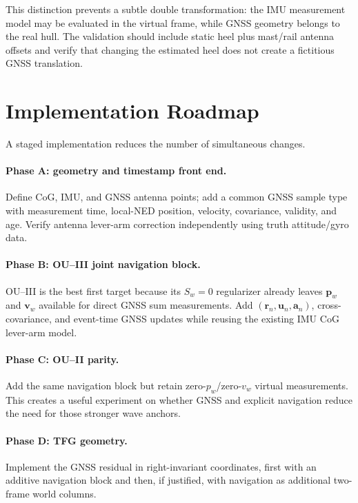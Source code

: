 \documentclass[conference]{IEEEtran}
\DeclareRobustCommand{\vct}[1]{\bm{#1}}
\begin{document}
This distinction prevents a subtle double transformation: the IMU measurement model
may be evaluated in the virtual frame, while GNSS geometry belongs to the real hull.
The validation should include static heel plus mast/rail antenna offsets and verify
that changing the estimated heel does not create a fictitious GNSS translation.

\section{Implementation Roadmap}
\label{sec:roadmap}

A staged implementation reduces the number of simultaneous changes.

\paragraph{Phase A: geometry and timestamp front end.}
Define CoG, IMU, and GNSS antenna points; add a common GNSS sample type with measurement
time, local-NED position, velocity, covariance, validity, and age.  Verify antenna
lever-arm correction independently using truth attitude/gyro data.

\paragraph{Phase B: OU--III joint navigation block.}
OU--III is the best first target because its $S_w=0$ regularizer already leaves
$\vct p_w$ and $\vct v_w$ available for direct GNSS sum measurements.  Add
$(\vct r_n,\vct u_n,\vct a_n)$, cross-covariance, and event-time GNSS updates while
reusing the existing IMU CoG lever-arm model.

\paragraph{Phase C: OU--II parity.}
Add the same navigation block but retain zero-$p_w$/zero-$v_w$ virtual measurements.
This creates a useful experiment on whether GNSS and explicit navigation reduce the
need for those stronger wave anchors.

\paragraph{Phase D: TFG geometry.}
Implement the GNSS residual in right-invariant coordinates, first with an additive
navigation block and then, if justified, with navigation as additional two-frame world
columns.
\end{document}
